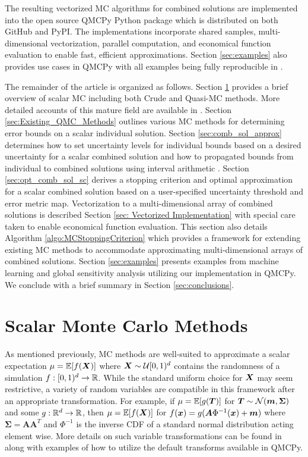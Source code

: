 \documentclass{article}[12pt]
\begin{document}
The resulting vectorized MC algorithms for combined solutions are implemented into the open source QMCPy Python package \cite{QMCPy} which is distributed on both GitHub and PyPI. The implementations incorporate shared samples, multi-dimensional vectorization, parallel computation, and economical function evaluation to enable fast, efficient approximations. Section \ref{sec:examples} also provides use cases in QMCPy with all examples being fully reproducible in .

The remainder of the article is organized as follows. Section \ref{sec:MCM} provides a brief overview of scalar MC including both Crude and Quasi-MC methods. More detailed accounts of this mature field are available in \cite{niederreiter1992random,mcbook}. Section \ref{sec:Existing_QMC_Methods} outlines various MC methods for determining error bounds on a scalar individual solution. Section \ref{sec:comb_sol_approx} determines how to set uncertainty levels for individual bounds based on a desired uncertainty for a scalar combined solution and how to propagated bounds from individual to combined solutions using interval arithmetic \cite{interval_analysis}. Section \ref{sec:opt_comb_sol_sc} derives a stopping criterion and optimal approximation for a scalar combined solution based on a user-specified uncertainty threshold and error metric map. Vectorization to a multi-dimensional array of combined solutions is described Section \ref{sec: Vectorized Implementation} with special care taken to enable economical function evaluation. This section also details Algorithm \ref{algo:MCStoppingCriterion} which provides a framework for extending existing MC methods to accommodate approximating multi-dimensional arrays of combined solutions. Section \ref{sec:examples} presents examples from machine learning and global sensitivity analysis utilizing our implementation in QMCPy. We conclude with a brief summary  in Section \ref{sec:conclusions}.   

\section{Scalar Monte Carlo Methods} \label{sec:MCM}

As mentioned previously, MC methods are well-suited to approximate a scalar expectation $\mu = \mathbb{E}[f(\boldsymbol{X})]$ where $\boldsymbol{X} \sim \mathcal{U}[0,1)^d$ contains the randomness of a simulation $f: [0,1)^{d} \to \mathbb{R}$. While the standard uniform choice for $\boldsymbol{X}$ may seem restrictive, a variety of random variables are compatible in this framework after an appropriate transformation. For example, if $\mu = \mathbb{E}[g(\boldsymbol{T})]$ for $\boldsymbol{T} \sim \mathcal{N}(\boldsymbol{m},\boldsymbol{\Sigma})$ and some $g: \mathbb{R}^{d} \to \mathbb{R}$, then $\mu = \mathbb{E}[f(\boldsymbol{X})]$ for  $f(\boldsymbol{x})=g(\boldsymbol{A}\Phi^{-1}(\boldsymbol{x})+\boldsymbol{m})$ where $\boldsymbol{\Sigma}=\boldsymbol{A}\boldsymbol{A}^T$ and $\Phi^{-1}$ is the inverse CDF of a standard normal distribution acting element wise. More details on such variable transformations can be found in \cite{QMCSoftware} along with examples of how to utilize the default transforms available in QMCPy.
\end{document}

